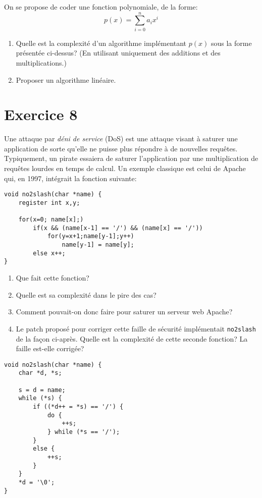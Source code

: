 \documentclass[a4paper,10pt]{article}
\begin{document}
On se propose de coder une fonction polynomiale, de la forme:
$$
p(x) = \sum_{i=0}^n a_i x^i
$$

\begin{enumerate}

\item Quelle est la complexité d'un algorithme implémentant $p(x)$ sous la forme présentée ci-dessus? (En utilisant uniquement des additions et des multiplications.)

\item Proposer un algorithme linéaire.

\end{enumerate}

\section*{Exercice 8}

Une attaque par \textit{déni de service} (DoS) est une attaque visant à saturer
une application de sorte qu'elle ne puisse plus répondre à de nouvelles
requêtes. Typiquement, un pirate essaiera de saturer l'application par une
multiplication de requêtes lourdes en temps de calcul. Un exemple classique est
celui de Apache qui, en 1997, intégrait la fonction suivante:

\begin{verbatim}
void no2slash(char *name) {
    register int x,y;

    for(x=0; name[x];)
        if(x && (name[x-1] == '/') && (name[x] == '/'))
            for(y=x+1;name[y-1];y++)
                name[y-1] = name[y];
        else x++;
}
\end{verbatim}

\begin{enumerate}
\item Que fait cette fonction?
\item Quelle est sa complexité dans le pire des cas?
\item Comment pouvait-on donc faire pour saturer un serveur web Apache?
\item Le patch proposé pour corriger cette faille de sécurité implémentait
\texttt{no2slash} de la façon ci-après. Quelle est la complexité de cette seconde fonction? La faille est-elle corrigée?
\end{enumerate}

\begin{verbatim}
void no2slash(char *name) {
    char *d, *s;

    s = d = name;
    while (*s) {
        if ((*d++ = *s) == '/') {
            do {
                ++s;
            } while (*s == '/');
        }
        else {
            ++s;
        }
    }
    *d = '\0';
}
\end{verbatim}
\end{document}
